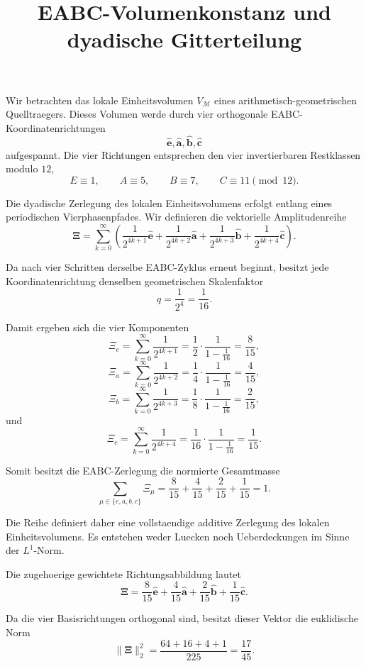 \documentclass[a4paper,11pt]{article}
\title{EABC-Volumenkonstanz und dyadische Gitterteilung}
\date{}
\begin{document}
\maketitle

Wir betrachten das lokale Einheitsvolumen \(V_{\mathcal M}\) eines
arithmetisch-geometrischen Quelltraegers. Dieses Volumen werde durch vier
orthogonale EABC-Koordinatenrichtungen
\[
\hat{\mathbf e},\hat{\mathbf a},\hat{\mathbf b},\hat{\mathbf c}
\]
aufgespannt. Die vier Richtungen entsprechen den vier invertierbaren
Restklassen modulo \(12\),
\[
E \equiv 1,\qquad A \equiv 5,\qquad B \equiv 7,\qquad C \equiv 11 \pmod{12}.
\]

Die dyadische Zerlegung des lokalen Einheitsvolumens erfolgt entlang eines
periodischen Vierphasenpfades. Wir definieren die vektorielle
Amplitudenreihe
\[
\boldsymbol{\Xi}
=
\sum_{k=0}^{\infty}
\left(
\frac{1}{2^{4k+1}}\hat{\mathbf e}
+
\frac{1}{2^{4k+2}}\hat{\mathbf a}
+
\frac{1}{2^{4k+3}}\hat{\mathbf b}
+
\frac{1}{2^{4k+4}}\hat{\mathbf c}
\right).
\]

Da nach vier Schritten derselbe EABC-Zyklus erneut beginnt, besitzt jede
Koordinatenrichtung denselben geometrischen Skalenfaktor
\[
q=\frac{1}{2^4}=\frac{1}{16}.
\]

Damit ergeben sich die vier Komponenten
\[
\Xi_e
=
\sum_{k=0}^{\infty}\frac{1}{2^{4k+1}}
=
\frac{1}{2}\cdot\frac{1}{1-\frac{1}{16}}
=
\frac{8}{15},
\]
\[
\Xi_a
=
\sum_{k=0}^{\infty}\frac{1}{2^{4k+2}}
=
\frac{1}{4}\cdot\frac{1}{1-\frac{1}{16}}
=
\frac{4}{15},
\]
\[
\Xi_b
=
\sum_{k=0}^{\infty}\frac{1}{2^{4k+3}}
=
\frac{1}{8}\cdot\frac{1}{1-\frac{1}{16}}
=
\frac{2}{15},
\]
und
\[
\Xi_c
=
\sum_{k=0}^{\infty}\frac{1}{2^{4k+4}}
=
\frac{1}{16}\cdot\frac{1}{1-\frac{1}{16}}
=
\frac{1}{15}.
\]

Somit besitzt die EABC-Zerlegung die normierte Gesamtmasse
\[
\sum_{\mu\in\{e,a,b,c\}}\Xi_\mu
=
\frac{8}{15}
+
\frac{4}{15}
+
\frac{2}{15}
+
\frac{1}{15}
=
1.
\]

Die Reihe definiert daher eine vollstaendige additive Zerlegung des lokalen
Einheitsvolumens. Es entstehen weder Luecken noch Ueberdeckungen im Sinne
der \(L^1\)-Norm.

Die zugehoerige gewichtete Richtungsabbildung lautet
\[
\boldsymbol{\Xi}
=
\frac{8}{15}\hat{\mathbf e}
+
\frac{4}{15}\hat{\mathbf a}
+
\frac{2}{15}\hat{\mathbf b}
+
\frac{1}{15}\hat{\mathbf c}.
\]

Da die vier Basisrichtungen orthogonal sind, besitzt dieser Vektor die
euklidische Norm
\[
\lVert\boldsymbol{\Xi}\rVert_2^2
=
\frac{64+16+4+1}{225}
=
\frac{17}{45}.
\]
\end{document}
